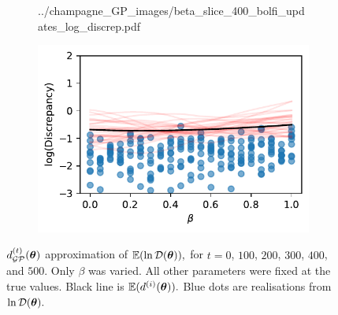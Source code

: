 \begin{figure}[htbp]
\begin{subfigure}[b]{0.5\textwidth}
{            ../champagne_GP_images/beta_slice_400_bolfi_updates_log_discrep.pdf
        }
    \end{subfigure}%
    \hfill%
    \begin{subfigure}[b]{0.5\textwidth}
        \centering
        \includegraphics[width=\textwidth]{
            ../champagne_GP_images/beta_slice_500_bolfi_updates_log_discrep.pdf
        }
    \end{subfigure}
    \caption{
        $d_{\mathcal{GP}}^{(t)}(\bm{\theta})$ approximation of $\operatorname{\mathbb{E}}(\ln\mathcal{D}(\bm{\theta})),$ 
        for $t= 0$, $100$, $200$, $300$, $400$, and $500.$ Only $\beta$ was 
        varied. All other parameters were fixed at the true values. Black line 
        is
        $\operatorname{\mathbb{E}}(d^{(i)}(\bm{\theta})).$
        Blue dots are realisations from $\ln\mathcal{D}(\bm{\theta}).$
    }
\end{figure}

